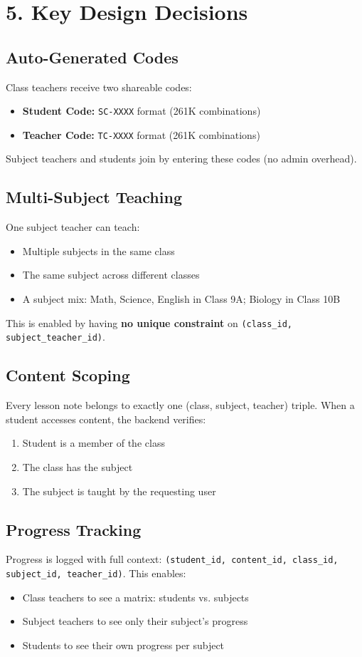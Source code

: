 \documentclass[11pt,a4paper]{article}
\begin{document}
\section*{5. Key Design Decisions}

\subsection*{Auto-Generated Codes}
Class teachers receive two shareable codes:
\begin{itemize}
    \item \textbf{Student Code:} \texttt{SC-XXXX} format (261K combinations)
    \item \textbf{Teacher Code:} \texttt{TC-XXXX} format (261K combinations)
\end{itemize}
Subject teachers and students join by entering these codes (no admin overhead).

\subsection*{Multi-Subject Teaching}
One subject teacher can teach:
\begin{itemize}
    \item Multiple subjects in the same class
    \item The same subject across different classes
    \item A subject mix: Math, Science, English in Class 9A; Biology in Class 10B
\end{itemize}
This is enabled by having \textbf{no unique constraint} on \texttt{(class\_id, subject\_teacher\_id)}.

\subsection*{Content Scoping}
Every lesson note belongs to exactly one (class, subject, teacher) triple. When a student accesses content, the backend verifies:
\begin{enumerate}
    \item Student is a member of the class
    \item The class has the subject
    \item The subject is taught by the requesting user
\end{enumerate}

\subsection*{Progress Tracking}
Progress is logged with full context: \texttt{(student\_id, content\_id, class\_id, subject\_id, teacher\_id)}. This enables:
\begin{itemize}
    \item Class teachers to see a matrix: students vs. subjects
    \item Subject teachers to see only their subject's progress
    \item Students to see their own progress per subject
\end{itemize}
\end{document}
